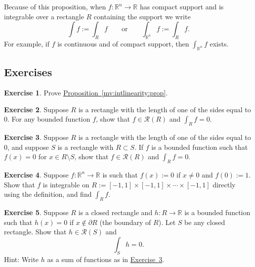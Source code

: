 \documentclass[12pt]{book}
\newcommand{\R}{{\mathbb{R}}}
\newcommand{\sR}{{\mathcal{R}}}
\theoremstyle{plain}
\theoremstyle{remark}
\theoremstyle{definition}
\theoremstyle{exercise}
\newtheorem{exercise}{Exercise}[section]
\theoremstyle{example}
\newcommand{\exerciseref}[1]{\hyperref[#1]{Exercise~\ref*{#1}}}
\newcommand{\propref}[1]{\hyperref[#1]{Proposition~\ref*{#1}}}
\begin{document}
Because of this proposition, when $f \colon \R^n \to \R$ has compact support
and is integrable over a rectangle $R$ containing the support we write
\begin{equation*}
\int f := \int_R f \qquad \text{or} \qquad 
\int_{\R^n} f := \int_R f .
\end{equation*}
For example, if $f$ is continuous and of compact support, then
$\int_{\R^n} f$ exists.

\subsection{Exercises}

\begin{exercise}
Prove \propref{mv:intlinearity:prop}.
\end{exercise}


\begin{exercise}
Suppose $R$ is a rectangle with the length of one of the sides equal to 0.
For any bounded function $f$, show that $f \in \sR(R)$ and $\int_R f = 0$.
\end{exercise}

\begin{exercise} \label{mv:zerosiderectangle}
Suppose $R$ is a rectangle with the length of one of the sides equal to 0,
and suppose $S$ is a rectangle with $R \subset S$.  If $f$
is a bounded function such that $f(x) = 0$ for $x \in R \setminus S$, show
that $f \in \sR(R)$ and $\int_R f = 0$.
\end{exercise}



\begin{exercise}
Suppose $f\colon \R^n \to \R$ is such that
$f(x) := 0$ if $x\not= 0$ and $f(0) := 1$.  Show that $f$ is integrable
on $R := [-1,1] \times [-1,1] \times \cdots \times [-1,1]$ directly using the
definition, and find $\int_R f$.
\end{exercise}

\begin{exercise} \label{mv:zeroinside}
Suppose $R$ is a closed rectangle and $h \colon R \to \R$ is a bounded function
such that $h(x) = 0$ if $x \notin \partial R$ (the boundary of $R$).
Let $S$ be any closed rectangle.
Show that $h \in \sR(S)$ and
\begin{equation*}
\int_{S} h = 0 .
\end{equation*}
Hint: Write $h$ as a sum of functions as in \exerciseref{mv:zerosiderectangle}.
\end{exercise}
\end{document}
